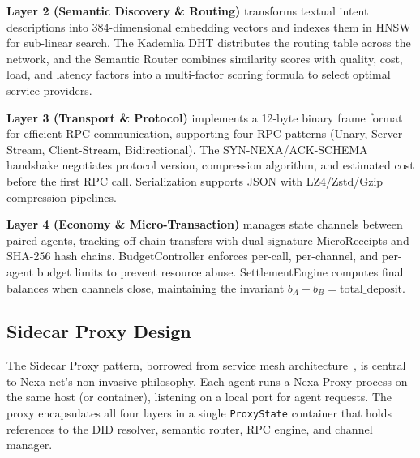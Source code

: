 \textbf{Layer 2 (Semantic Discovery \& Routing)} transforms textual intent descriptions into 384-dimensional embedding vectors and indexes them in HNSW for sub-linear search. The Kademlia DHT distributes the routing table across the network, and the Semantic Router combines similarity scores with quality, cost, load, and latency factors into a multi-factor scoring formula to select optimal service providers.

\textbf{Layer 3 (Transport \& Protocol)} implements a 12-byte binary frame format for efficient RPC communication, supporting four RPC patterns (Unary, Server-Stream, Client-Stream, Bidirectional). The SYN-NEXA/ACK-SCHEMA handshake negotiates protocol version, compression algorithm, and estimated cost before the first RPC call. Serialization supports JSON with LZ4/Zstd/Gzip compression pipelines.

\textbf{Layer 4 (Economy \& Micro-Transaction)} manages state channels between paired agents, tracking off-chain transfers with dual-signature MicroReceipts and SHA-256 hash chains. BudgetController enforces per-call, per-channel, and per-agent budget limits to prevent resource abuse. SettlementEngine computes final balances when channels close, maintaining the invariant $b_A + b_B = \text{total\_deposit}$.

\subsection{Sidecar Proxy Design}

The Sidecar Proxy pattern, borrowed from service mesh architecture~\cite{envoy2017,istio2018}, is central to Nexa-net's non-invasive philosophy. Each agent runs a Nexa-Proxy process on the same host (or container), listening on a local port for agent requests. The proxy encapsulates all four layers in a single \texttt{ProxyState} container that holds references to the DID resolver, semantic router, RPC engine, and channel manager.

